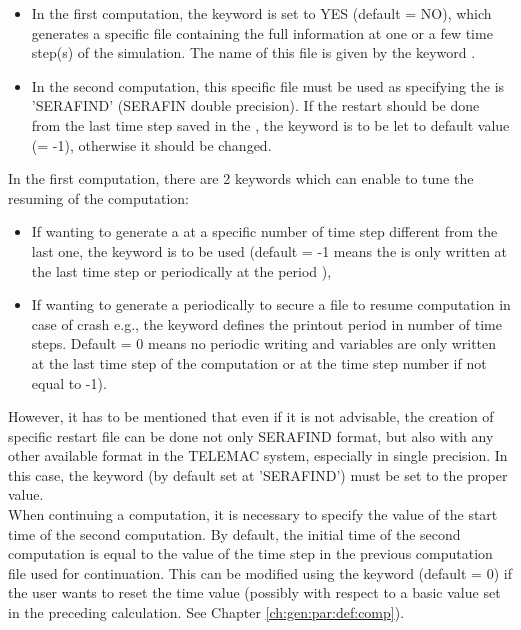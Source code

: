 \begin{itemize}
\item In the first computation, the keyword  is set to
YES (default = NO),
which generates a specific file containing the full information at one or a
few time step(s) of the simulation.
The name of this file is given by the keyword .

\item In the second computation, this specific file must be used as
 specifying the  is 'SERAFIND' (SERAFIN double precision).
If the restart should be done from the last time step saved in the
, the keyword  is to be
let to default value (= -1), otherwise it should be changed.
\end{itemize}

In the first computation, there are 2 keywords which can enable to tune the
resuming of the computation:
\begin{itemize}
\item If wanting to generate a  at a specific number of
time step different from the last one, the keyword
 is to be used
(default = -1 means the  is only written at the last
time step or periodically at the period ),
\item If wanting to generate a  periodically to secure a
file to resume computation in case of crash e.g., the keyword
 defines the printout period in number of
time steps.
Default = 0 means no periodic writing and variables are only written at the last
time step of the computation or at the time step number
 if not equal to -1).
\end{itemize}

However, it has to be mentioned that even if it is not advisable, the creation
of specific restart file can be done not only SERAFIND format, but also with
any other available format in the TELEMAC system, especially in single
precision. In this case, the keyword  (by default
set at 'SERAFIND') must be set to the proper value.
\\

When continuing a computation, it is necessary to specify the value of
the start time of the second computation.
By default, the initial time of the second computation is equal to the value
of the time step in the previous computation file used for continuation.
This can be modified using the keyword 
(default = 0)
if the user wants to reset the time value (possibly with respect to a basic
value set in the preceding calculation.
See Chapter \ref{ch:gen:par:def:comp}).

